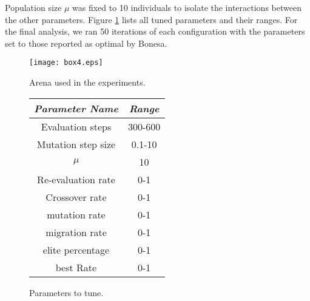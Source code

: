 \documentclass[runningheads]{llncs}
\begin{document}
Population size $\mu$ was fixed to 10 individuals to isolate the
interactions between the other parameters. Figure \ref{tab:parameters}
lists all tuned parameters and their ranges. For the final analysis,
we ran 50 iterations of each configuration with the parameters set to
those reported as optimal by Bonesa. 

\begin{figure}[b!]
  \centering
 
  \begin{minipage}[c]{0.58\textwidth}
  \centering
    \texttt{[image: box4.eps]}
    \caption{Arena used in the experiments.}
    \label{fig:arena}
  \end{minipage}
   \begin{minipage}[c]{0.38\textwidth}
    \centering
    \begin{tabular}{|c|c|}
\hline
{\em Parameter Name} & {\em Range} \\\hline
Evaluation steps & 300-600  \\\hline
Mutation step size & 0.1-10 \\\hline
$\mu$ &  10 \\\hline
Re-evaluation rate & 0-1  \\\hline
Crossover rate &  0-1\\\hline
mutation rate &  0-1\\\hline
migration rate &  0-1\\\hline
elite percentage & 0-1 \\\hline
best Rate &  0-1\\\hline
\end{tabular}
	\caption{Parameters to tune.}
	\label{tab:parameters}
  \end{minipage}
  \end{figure}



\end{document}
